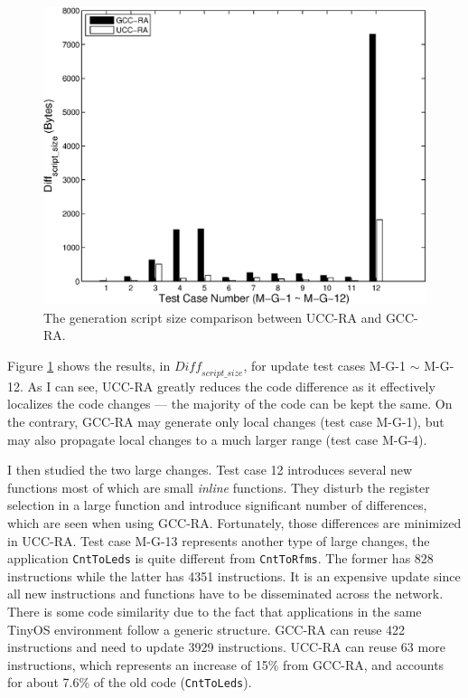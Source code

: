 \vspace{0.2in}
\begin{figure}[htbp]
\centering
\includegraphics[scale=0.6]{figures/upd.eps}
\caption{The generation script size comparison between UCC-RA and GCC-RA.}
\label{fexp.upd}
\end{figure}

Figure \ref{fexp.upd} shows the results, in $\textit{Diff}_{script\_size}$, for update
test cases M-G-1 $\sim$ M-G-12.  As I can see, UCC-RA greatly reduces the code
difference as it effectively localizes the code changes --- the
majority of the code can be kept the same.  On the contrary, GCC-RA
may generate only local changes (test case M-G-1), but may also propagate local
changes to a much larger range (test case M-G-4).

I then studied the two large changes. Test case 12 introduces
several new functions most of which are small {\em inline}
functions. They disturb the register selection in a large function and
introduce significant number of differences, which are seen when using
GCC-RA. Fortunately, those differences are minimized in UCC-RA.
Test case M-G-13 represents another type of large
changes, the application {\tt CntToLeds} is quite different from
{\tt CntToRfms}.  The former has 828 instructions while the latter has
4351 instructions. It is an expensive update since all new instructions
and functions have to be disseminated across the network. There is
some code similarity due to the fact that applications in the same
TinyOS environment follow a generic structure.  GCC-RA can reuse 422
instructions and need to update 3929 instructions. UCC-RA can reuse 63
more instructions, which represents an increase of 15\% from GCC-RA,
and accounts for about 7.6\% of the old code ({\tt CntToLeds}).

